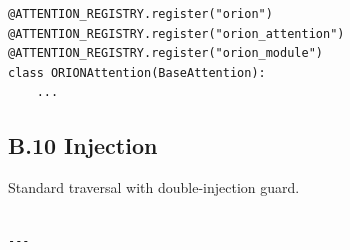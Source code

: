 \begin{lstlisting}
@ATTENTION_REGISTRY.register("orion")
@ATTENTION_REGISTRY.register("orion_attention")
@ATTENTION_REGISTRY.register("orion_module")
class ORIONAttention(BaseAttention):
    ...
\end{lstlisting}

\subsection{B.10 Injection}

Standard traversal with double-injection guard.
\begin{lstlisting}

---
\end{lstlisting}